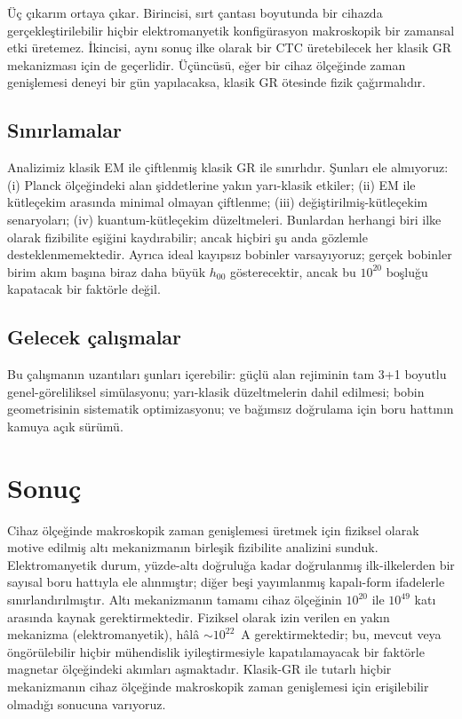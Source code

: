 \documentclass[11pt,a4paper,twocolumn]{article}
\begin{document}
Üç çıkarım ortaya çıkar. Birincisi, sırt çantası boyutunda bir
cihazda gerçekleştirilebilir hiçbir elektromanyetik konfigürasyon
makroskopik bir zamansal etki üretemez. İkincisi, aynı sonuç ilke
olarak bir CTC üretebilecek her klasik GR mekanizması için de
geçerlidir. Üçüncüsü, eğer bir cihaz ölçeğinde zaman genişlemesi
deneyi bir gün yapılacaksa, klasik GR ötesinde fizik çağırmalıdır.

\subsection{Sınırlamalar}
\label{subsec:limits}

Analizimiz klasik EM ile çiftlenmiş klasik GR ile sınırlıdır. Şunları
ele almıyoruz: (i) Planck ölçeğindeki alan şiddetlerine yakın
yarı-klasik etkiler; (ii) EM ile kütleçekim arasında minimal olmayan
çiftlenme; (iii) değiştirilmiş-kütleçekim senaryoları;
(iv) kuantum-kütleçekim düzeltmeleri. Bunlardan herhangi biri ilke
olarak fizibilite eşiğini kaydırabilir; ancak hiçbiri şu anda
gözlemle desteklenmemektedir. Ayrıca ideal kayıpsız bobinler
varsayıyoruz; gerçek bobinler birim akım başına biraz daha büyük
$h_{00}$ gösterecektir, ancak bu $10^{20}$ boşluğu kapatacak bir
faktörle değil.

\subsection{Gelecek çalışmalar}
\label{subsec:future}

Bu çalışmanın uzantıları şunları içerebilir: güçlü alan rejiminin
tam 3+1 boyutlu genel-göreliliksel simülasyonu; yarı-klasik
düzeltmelerin dahil edilmesi; bobin geometrisinin sistematik
optimizasyonu; ve bağımsız doğrulama için boru hattının kamuya açık
sürümü.

\section{Sonuç}
\label{sec:conclusion}

Cihaz ölçeğinde makroskopik zaman genişlemesi üretmek için fiziksel
olarak motive edilmiş altı mekanizmanın birleşik fizibilite
analizini sunduk. Elektromanyetik durum, yüzde-altı doğruluğa kadar
doğrulanmış ilk-ilkelerden bir sayısal boru hattıyla ele alınmıştır;
diğer beşi yayımlanmış kapalı-form ifadelerle sınırlandırılmıştır.
Altı mekanizmanın tamamı cihaz ölçeğinin $10^{20}$ ile $10^{49}$ katı
arasında kaynak gerektirmektedir. Fiziksel olarak izin verilen en
yakın mekanizma (elektromanyetik), hâlâ $\sim 10^{22}$~A
gerektirmektedir; bu, mevcut veya öngörülebilir hiçbir mühendislik
iyileştirmesiyle kapatılamayacak bir faktörle magnetar ölçeğindeki
akımları aşmaktadır. Klasik-GR ile tutarlı hiçbir mekanizmanın cihaz
ölçeğinde makroskopik zaman genişlemesi için erişilebilir olmadığı
sonucuna varıyoruz.
\end{document}
